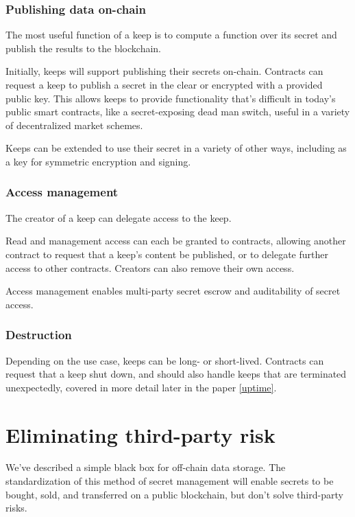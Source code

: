 \documentclass[11pt]{article}
\begin{document}
\subsubsection{Publishing data on-chain}

The most useful function of a keep is to compute a function over its
secret and publish the results to the blockchain.

Initially, keeps will support publishing their secrets on-chain.
Contracts can request a keep to publish a secret in the clear or
encrypted with a provided public key. This allows keeps to provide
functionality that’s difficult in today’s public smart contracts, like
a secret-exposing dead man switch, useful in a variety of
decentralized market schemes.

Keeps can be extended to use their secret in a variety of other ways,
including as a key for symmetric encryption and signing.

\subsubsection{Access management}

The creator of a keep can delegate access to the keep.

Read and management access can each be granted to contracts, allowing
another contract to request that a keep’s content be published, or to
delegate further access to other contracts. Creators can also remove
their own access.

Access management  enables multi-party secret escrow and auditability
of secret access.

\subsubsection{Destruction}

Depending on the use case, keeps can be long- or short-lived.
Contracts can request that a keep shut down, and should also handle
keeps that are terminated unexpectedly, covered in more detail later
in the paper \ref{uptime}.

\section{Eliminating third-party risk}

We’ve described a simple black box for off-chain data storage. The
standardization of this method of secret management will enable
secrets to be bought, sold, and transferred on a public blockchain,
but don’t solve third-party risks.
\end{document}
